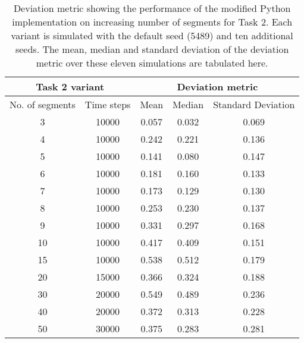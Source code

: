 
\begin{table}[h!]
\begin{center}
 \begin{tabular}{||c | c | c c c ||} 
 \hline
   \multicolumn{2}{||c|}{Task 2 variant} & \multicolumn{3}{c||}{Deviation metric} \\ [0.5ex] 
\hline
No. of segments & Time steps & Mean & Median & Standard Deviation \\ [0.5ex] 
 \hline\hline
 3 & 10000 & 0.057 &	0.032 &	0.069 \\ 
 \hline
 4 & 10000 & 0.242 &	0.221 &	0.136 \\ 
 \hline
 5 & 10000 & 0.141 &	0.080 &	0.147 \\ 
 \hline
 6 & 10000 & 0.181 &	0.160 &	0.133 \\ 
 \hline
 7 & 10000 & 0.173 &	0.129 &	0.130 \\ 
 \hline
 8 & 10000 & 0.253 &	0.230 &	0.137 \\ 
 \hline
 9 & 10000 & 0.331 &	0.297 &	0.168 \\ 
 \hline
 10 & 10000 & 0.417 &	0.409 &	0.151 \\ 
 \hline
 15 & 10000 & 0.538 &	0.512 &	0.179 \\ 
 \hline 
 20 & 15000 & 0.366 &	0.324 &	0.188 \\ 
 \hline
 30 & 20000 & 0.549 &	0.489 &	0.236 \\ 
 \hline
 40 & 20000 & 0.372 &	0.313 &	0.228 \\ 
 \hline
 50 & 30000 & 0.375 &	0.283 &	0.281 \\ [1ex] 
 \hline
\end{tabular}
\end{center}
 \caption{Deviation metric showing the performance of the modified Python implementation on increasing number of segments for Task 2. Each variant is simulated with the default seed (5489) and ten additional seeds. The mean, median and standard deviation of the deviation metric over these eleven simulations are tabulated here.}
 \label{Table:deviation_scalability}
\end{table}
